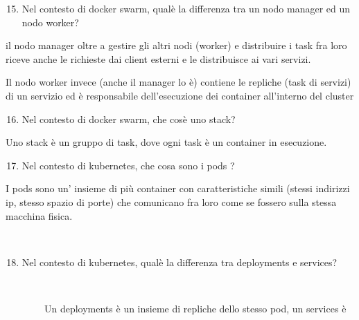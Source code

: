 \documentclass[
]{article}
\providecommand{\tightlist}{%
  \setlength{\itemsep}{0pt}\setlength{\parskip}{0pt}}
\begin{document}
{}

{}

\begin{enumerate}
\setcounter{enumi}{14}
\tightlist
\item
  {Nel contesto di docker swarm, qual\textquotesingle è la differenza
  tra un nodo manager ed un nodo worker?}
\end{enumerate}

{}

{il nodo manager oltre a gestire gli altri nodi (worker) e distribuire i
task fra loro riceve anche le richieste dai client esterni e le
distribuisce ai vari servizi.}

{Il nodo worker invece (anche il manager lo è) contiene le repliche
(task di servizi) di un servizio ed è responsabile dell'esecuzione dei
container all'interno del cluster}

{}

{}

\begin{enumerate}
\setcounter{enumi}{15}
\tightlist
\item
  {Nel contesto di docker swarm, che cos\textquotesingle è uno stack? }
\end{enumerate}

{}

{Uno stack è un gruppo di task, dove ogni task è un container in
esecuzione.}

{}

{}

\begin{enumerate}
\setcounter{enumi}{16}
\tightlist
\item
  {Nel contesto di kubernetes, che cosa sono i pods ?}
\end{enumerate}

{}

{I pods sono un' insieme di più container con caratteristiche simili
(stessi indirizzi ip, stesso spazio di porte) che comunicano fra loro
come se fossero sulla stessa macchina fisica.}

{~}

{}

\begin{enumerate}
\setcounter{enumi}{17}
\tightlist
\item
  {Nel contesto di kubernetes, qual\textquotesingle è la differenza tra
  deployments e services?}
\end{enumerate}

{~~~~~~~~}

{~~~~~~~~Un deployments è un insieme di repliche dello stesso pod, un
services è }
\end{document}

